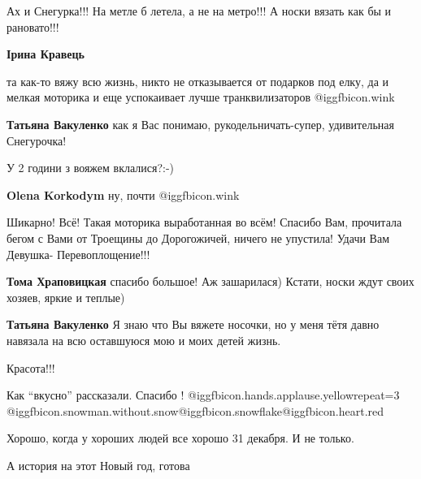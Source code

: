  
 
 
 
 
\zzSecCmt

\begin{itemize} %
Ах и Снегурка!!! На метле б летела, а не на метро!!! А носки вязать как бы и рановато!!!

\textbf{Ірина Кравець} 

та как-то вяжу всю жизнь, никто не отказывается от подарков под елку, да и
мелкая моторика и еще успокаивает лучше транквилизаторов @igg{fbicon.wink} 

\textbf{Татьяна Вакуленко} как я Вас понимаю, рукодельничать-супер, удивительная Снегурочка!

У 2 години з вояжем вклалися?:-)

\textbf{Olena Korkodym} ну, почти @igg{fbicon.wink} 


Шикарно! Всё! Такая моторика выработанная во всём! Спасибо Вам, прочитала бегом
с Вами от Троещины до Дорогожичей, ничего не упустила! Удачи Вам Девушка-
Перевоплощение!!!

\begin{itemize} %
\textbf{Тома Храповицкая} спасибо большое! Аж зашарилася)
Кстати, носки ждут своих хозяев, яркие и теплые)

\textbf{Татьяна Вакуленко} Я знаю что Вы вяжете носочки, но у меня тётя давно навязала на всю оставшуюся мою и моих детей жизнь.
\end{itemize} %

Красота!!!

Как \enquote{вкусно} рассказали. Спасибо ! @igg{fbicon.hands.applause.yellow}{repeat=3} @igg{fbicon.snowman.without.snow}@igg{fbicon.snowflake}@igg{fbicon.heart.red}

Хорошо, когда у хороших людей все хорошо 31 декабря. И не только.

А история на этот Новый год, готова 


\end{itemize}
